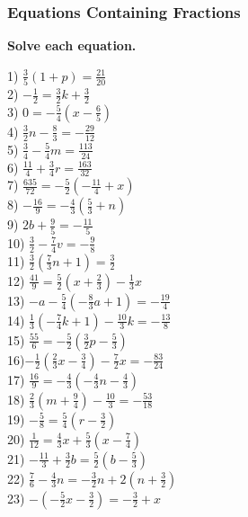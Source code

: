 \documentclass[12pt]{book}
\theoremstyle{definition}
\begin{document}
\subsubsection*{Equations Containing Fractions}
{\bf Solve each equation.}
\begin{multicols}{2}
  1) $\frac{3}{5} (1 + p) = \frac{21}{20}$\\
  2) $- \frac{1}{2} = \frac{3}{2} k + \frac{3}{2}$\\
  3) $0 = - \frac{5}{4} (x - \frac{6}{5})$\\
  4) $\frac{3}{2} n - \frac{8}{3} = - \frac{29}{12}$\\
  5) $\frac{3}{4} - \frac{5}{4} m = \frac{113}{24}$\\
  6) $\frac{11}{4} + \frac{3}{4} r = \frac{163}{32}$\\
  7) $\frac{635}{72} = - \frac{5}{2} (- \frac{11}{4} + x)$\\
  8) $- \frac{16}{9} = - \frac{4}{3} (\frac{5}{3} + n)$\\
  9) $2 b + \frac{9}{5} = - \frac{11}{5}$\\
  10) $\frac{3}{2} - \frac{7}{4} v = - \frac{9}{8}$\\
  11) $\frac{3}{2} (\frac{7}{3} n + 1) = \frac{3}{2}$\\
  12) $\frac{41}{9} = \frac{5}{2} (x + \frac{2}{3}) - \frac{1}{3} x$\\
  13) $- a - \frac{5}{4} (- \frac{8}{3} a + 1) = - \frac{19}{4}$\\
  14) $\frac{1}{3} (- \frac{7}{4} k + 1) - \frac{10}{3} k = - \frac{13}{8}$\\
  15) $\frac{55}{6} = - \frac{5}{2} (\frac{3}{2} p - \frac{5}{3})$\\
  16)$- \frac{1}{2} (\frac{2}{3} x - \frac{3}{4}) - \frac{7}{2} x = -\frac{83}{24}$\\
  17) $\frac{16}{9} = - \frac{4}{3} (- \frac{4}{3} n - \frac{4}{3})$\\
  18) $\frac{2}{3} (m + \frac{9}{4}) - \frac{10}{3} = - \frac{53}{18}$\\
  19) $- \frac{5}{8} = \frac{5}{4} (r - \frac{3}{2})$\\
  20) $\frac{1}{12} = \frac{4}{3} x + \frac{5}{3} (x - \frac{7}{4})$\\
  21) $- \frac{11}{3} + \frac{3}{2} b = \frac{5}{2} (b - \frac{5}{3})$\\
  22) $\frac{7}{6} - \frac{4}{3} n = - \frac{3}{2} n + 2 (n + \frac{3}{2})$\\
  23) $- (- \frac{5}{2} x - \frac{3}{2}) = - \frac{3}{2} + x$\\

\end{multicols}
\end{document}
